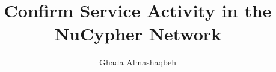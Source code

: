 \documentclass{llncs}
\begin{document}
\title{\Large \bf Confirm Service Activity in the NuCypher Network}
\author{Ghada Almashaqbeh}

\date{} %



\maketitle











\end{document}
